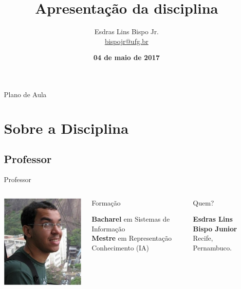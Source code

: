 \documentclass[xcolor=dvipsnames,table]{beamer}
\title{Apresentação da disciplina}
\author{
  Esdras Lins Bispo Jr. \\ \url{bispojr@ufg.br}
  }
\institute{
  Teoria da Computação \\Bacharelado em Ciência da Computação}
\date{\textbf{04 de maio de 2017} }
\begin{document}
	\begin{frame}
		\titlepage
	\end{frame}

	\AtBeginSection{
		\begin{frame}{Sumário}%
    		\tableofcontents[currentsection]
		\end{frame}
	}

	\begin{frame}{Plano de Aula}
		\tableofcontents
	\end{frame}
	
	\section{Sobre a Disciplina}
	\subsection{Professor}
	\begin{frame}{Professor}
		\begin{columns}
		  		\begin{center}
		    		\includegraphics[height=.5\textheight]{images/esdras.png}
		  		\end{center}
				\begin{block}{Formação}
					\begin{center}
						{\normalsize {\bf Bacharel} em Sistemas de Informação\\
						{\bf Mestre} em Representação Conhecimento (IA)}
					\end{center}
				\end{block}		  		
		  		\begin{block}{Quem?}
		  			\begin{center}
						{\bf Esdras Lins Bispo Junior} \\ Recife, Pernambuco.
					\end{center}
				\end{block}
		\end{columns}
	\end{frame}
	
\end{document}

